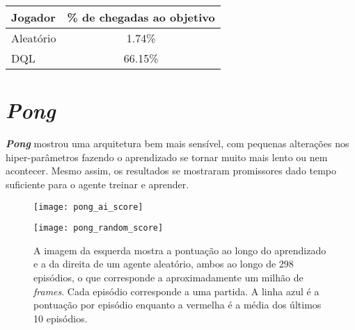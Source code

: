 \begin{center}
\begin{tabular}{l c}
\hline
Jogador & \% de chegadas ao objetivo \\
\hline
Aleatório & 1.74\% \\
DQL & 66.15\% \\
\hline
\end{tabular}
\label{table:gridworld_score}
\end{center}

\section{\textit{Pong}}
\label{sec:res_pong}

\textbf{\textit{Pong}} mostrou uma arquitetura bem mais sensível, com pequenas alterações nos hiper-parâmetros fazendo o aprendizado se tornar muito mais lento ou nem acontecer.
Mesmo assim, os resultados se mostraram promissores dado tempo suficiente para o agente treinar e aprender.


\begin{figure}[h!]
  \begin{minipage}[b]{.5\textwidth}
  \centering
  \texttt{[image: pong\_ai\_score]}
  \end{minipage}
  \hfill
  \begin{minipage}[b]{.5\textwidth}
  \centering
  \texttt{[image: pong\_random\_score]}
  \end{minipage}
  \caption{A imagem da esquerda mostra a pontuação ao longo do aprendizado e a da direita de um agente aleatório, ambos ao longo de 298 episódios, o que corresponde a aproximadamente um milhão de \textit{frames}. Cada episódio corresponde a uma partida. A linha azul é a pontuação por episódio enquanto a vermelha é a média dos últimos 10 episódios.}
  \label{fig:pong_score}
\end{figure}

